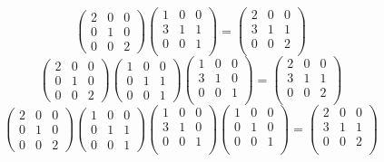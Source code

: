 \documentclass[a4paper]{article}
\begin{document}
\begin{equation*}
\begin{pmatrix}
2 & 0 & 0\\
0 & 1 & 0\\
0 & 0 & 2
\end{pmatrix}
\begin{pmatrix}
1 & 0 & 0\\
3 & 1 & 1\\
0 & 0 & 1\\
\end{pmatrix} = 
\begin{pmatrix}
2 & 0 & 0\\
3 & 1 & 1\\
0 & 0 & 2\\
\end{pmatrix}
\end{equation*}
\begin{equation*}
\begin{pmatrix}
2 & 0 & 0\\
0 & 1 & 0\\
0 & 0 & 2
\end{pmatrix}
\begin{pmatrix}
1 & 0 & 0\\
0 & 1 & 1\\
0 & 0 & 1
\end{pmatrix}
\begin{pmatrix}
1 & 0 & 0\\
3 & 1 & 0\\
0 & 0 & 1\\
\end{pmatrix} = 
\begin{pmatrix}
2 & 0 & 0\\
3 & 1 & 1\\
0 & 0 & 2\\
\end{pmatrix}
\end{equation*}
\begin{equation*}
\begin{pmatrix}
2 & 0 & 0\\
0 & 1 & 0\\
0 & 0 & 2
\end{pmatrix}
\begin{pmatrix}
1 & 0 & 0\\
0 & 1 & 1\\
0 & 0 & 1
\end{pmatrix}
\begin{pmatrix}
1 & 0 & 0\\
3 & 1 & 0\\
0 & 0 & 1\\
\end{pmatrix}
\begin{pmatrix}
1 & 0 & 0\\
0 & 1 & 0\\
0 & 0 & 1\\
\end{pmatrix} = 
\begin{pmatrix}
2 & 0 & 0\\
3 & 1 & 1\\
0 & 0 & 2\\
\end{pmatrix}
\end{equation*}
\end{document}
